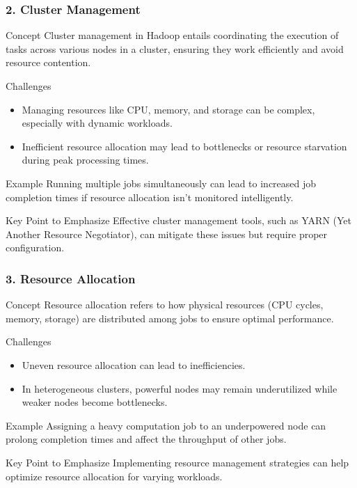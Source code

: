 \documentclass[aspectratio=169]{beamer}
\begin{document}
\begin{frame}[fragile]
    \frametitle{2. Cluster Management}
    \begin{block}{Concept}
        Cluster management in Hadoop entails coordinating the execution of tasks across various nodes in a cluster, ensuring they work efficiently and avoid resource contention.
    \end{block}
    
    \begin{block}{Challenges}
        \begin{itemize}
            \item Managing resources like CPU, memory, and storage can be complex, especially with dynamic workloads.
            \item Inefficient resource allocation may lead to bottlenecks or resource starvation during peak processing times.
        \end{itemize}
    \end{block}

    \begin{block}{Example}
        Running multiple jobs simultaneously can lead to increased job completion times if resource allocation isn't monitored intelligently.
    \end{block}

    \begin{block}{Key Point to Emphasize}
        Effective cluster management tools, such as YARN (Yet Another Resource Negotiator), can mitigate these issues but require proper configuration.
    \end{block}
\end{frame}

\begin{frame}[fragile]
    \frametitle{3. Resource Allocation}
    \begin{block}{Concept}
        Resource allocation refers to how physical resources (CPU cycles, memory, storage) are distributed among jobs to ensure optimal performance.
    \end{block}
    
    \begin{block}{Challenges}
        \begin{itemize}
            \item Uneven resource allocation can lead to inefficiencies.
            \item In heterogeneous clusters, powerful nodes may remain underutilized while weaker nodes become bottlenecks.
        \end{itemize}
    \end{block}

    \begin{block}{Example}
        Assigning a heavy computation job to an underpowered node can prolong completion times and affect the throughput of other jobs.
    \end{block}

    \begin{block}{Key Point to Emphasize}
        Implementing resource management strategies can help optimize resource allocation for varying workloads.
    \end{block}
\end{frame}
\end{document}
